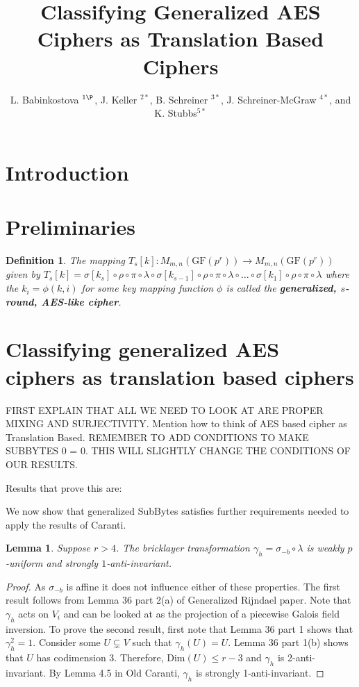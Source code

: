 \documentclass[11pt]{amsart}
\title{Classifying Generalized AES Ciphers as Translation Based Ciphers} %
\author{L. Babinkostova $^{1\P}$, J. Keller $^{2*}$, B. Schreiner $^{3*}$, J. Schreiner-McGraw $^{4*}$, and K. Stubbs$^{5*}$ }
\newcommand{\GF}{\mathrm{GF}}
\newtheorem{definition}{{\bf Definition}}
\newtheorem{lemma}[theorem]{{\bf Lemma }}
\begin{document}
\maketitle
\section{Introduction}

\section{Preliminaries}

\begin{definition}
The mapping $T_s[k] : M_{m,n}(\GF(p^r)) \to M_{m,n}(\GF(p^r))$ given by $T_s[k] = \sigma[k_s] \circ \rho \circ \pi \circ \lambda \circ \sigma[k_{s-1}] \circ \rho \circ \pi \circ \lambda \circ \dots \circ \sigma[k_1] \circ \rho \circ \pi \circ \lambda$ where the $k_i = \phi(k,i)$ for some key mapping function $\phi$ is called the {\bf generalized, $s$-round, AES-like cipher}.
\end{definition}





\section{Classifying generalized AES ciphers as translation based ciphers}
FIRST EXPLAIN THAT ALL WE NEED TO LOOK AT ARE PROPER MIXING AND SURJECTIVITY. Mention how to think of AES based cipher as Translation Based. REMEMBER TO ADD CONDITIONS TO MAKE SUBBYTES 0 = 0. THIS WILL SLIGHTLY CHANGE THE CONDITIONS OF OUR RESULTS.


Results that prove this are:


We now show that generalized SubBytes satisfies further requirements needed to apply the results of Caranti.

\begin{lemma}
Suppose $r > 4$. The bricklayer transformation $\gamma_h = \sigma_{-b} \circ \lambda$ is weakly $p$-uniform and strongly $1$-anti-invariant.
\end{lemma}
\begin{proof}
As $\sigma_{-b}$ is affine it does not influence either of these properties. The first result follows from Lemma 36 part 2(a) of Generalized Rijndael paper. Note that $\gamma_h$ acts on $V_i$ and can be looked at as the projection of a piecewise Galois field inversion. To prove the second result, first note that Lemma 36 part 1 shows that $\gamma_h^2 = 1$. Consider some $U \subsetneq V$ such that $\gamma_h(U) = U$. Lemma 36 part 1(b) shows that $U$ has codimension 3. Therefore, Dim$(U) \leq r-3$ and $\gamma_h$ is 2-anti-invariant. By Lemma 4.5 in Old Caranti, $\gamma_h$ is strongly 1-anti-invariant.
\end{proof}
\end{document}
